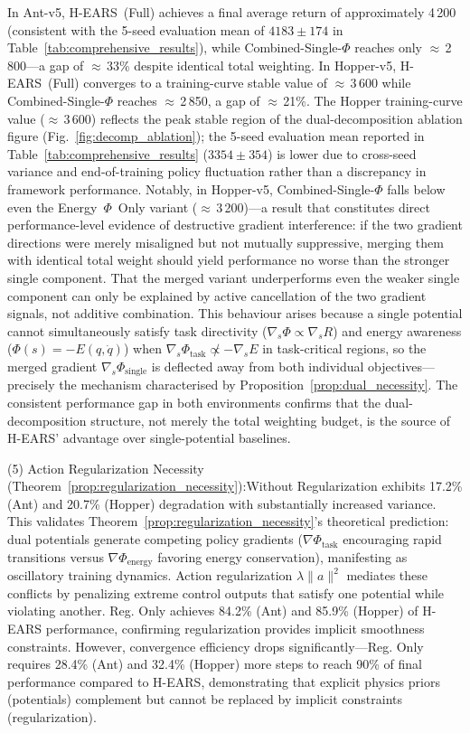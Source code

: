 \documentclass[journal]{IEEEtran}
\begin{document}
	In Ant-v5, H-EARS~(Full) achieves a final average return of approximately 4\,200 (consistent with the 5-seed evaluation mean of $4183\pm174$ in Table~\ref{tab:comprehensive_results}), while Combined-Single-$\Phi$ reaches only $\approx$\,2\,800---a gap of $\approx$\,33\% despite identical total weighting. In Hopper-v5, H-EARS~(Full) converges to a training-curve stable value of $\approx$\,3\,600 while Combined-Single-$\Phi$ reaches $\approx$\,2\,850, a gap of $\approx$\,21\%. The Hopper training-curve value ($\approx$\,3\,600) reflects the peak stable region of the dual-decomposition ablation figure (Fig.~\ref{fig:decomp_ablation}); the 5-seed evaluation mean reported in Table~\ref{tab:comprehensive_results} ($3354\pm354$) is lower due to cross-seed variance and end-of-training policy fluctuation rather than a discrepancy in framework performance. Notably, in Hopper-v5, Combined-Single-$\Phi$ falls below even the Energy~$\Phi$~Only variant ($\approx$\,3\,200)---a result that constitutes direct performance-level evidence of destructive gradient interference: if the two gradient directions were merely misaligned but not mutually suppressive, merging them with identical total weight should yield performance no worse than the stronger single component. That the merged variant underperforms even the weaker single component can only be explained by active cancellation of the two gradient signals, not additive combination. This behaviour arises because a single potential cannot simultaneously satisfy task directivity ($\nabla_s\Phi\propto\nabla_s R$) and energy awareness ($\Phi(s)=-E(q,\dot{q})$) when $\nabla_s\Phi_{\text{task}}\not\propto-\nabla_s E$ in task-critical regions, so the merged gradient $\nabla_s\Phi_{\text{single}}$ is deflected away from both individual objectives---precisely the mechanism characterised by Proposition~\ref{prop:dual_necessity}. The consistent performance gap in both environments confirms that the dual-decomposition structure, not merely the total weighting budget, is the source of H-EARS' advantage over single-potential baselines.
	
	(5) Action Regularization Necessity (Theorem~\ref{prop:regularization_necessity}):Without Regularization exhibits 17.2\% (Ant) and 20.7\% (Hopper) degradation with substantially increased variance. This validates Theorem~\ref{prop:regularization_necessity}'s theoretical prediction: dual potentials generate competing policy gradients ($\nabla\Phi_{\text{task}}$ encouraging rapid transitions versus $\nabla\Phi_{\text{energy}}$ favoring energy conservation), manifesting as oscillatory training dynamics. Action regularization $\lambda\|a\|^2$ mediates these conflicts by penalizing extreme control outputs that satisfy one potential while violating another. Reg. Only achieves 84.2\% (Ant) and 85.9\% (Hopper) of H-EARS performance, confirming regularization provides implicit smoothness constraints. However, convergence efficiency drops significantly—Reg. Only requires 28.4\% (Ant) and 32.4\% (Hopper) more steps to reach 90\% of final performance compared to H-EARS, demonstrating that explicit physics priors (potentials) complement but cannot be replaced by implicit constraints (regularization).
	
\end{document}

